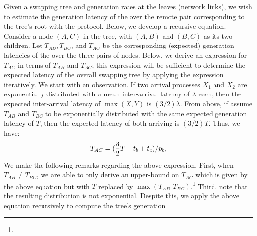 Given a swapping tree and \eps generation rates at the leaves (network links), we 
wish to estimate the generation latency of the \epss over the remote pair corresponding
to the tree's root with the \wt protocol. 
Below, we develop a recursive equation.
Consider a node $(A,C)$ in the tree, with $(A,B)$ and $(B,C)$ as its two children. 
Let $T_{AB}, T_{BC}$, and $T_{AC}$ be the corresponding (expected) generation latencies 
of the \epss over the three pairs of nodes. Below, we derive an expression for $T_{AC}$
in terms of  $T_{AB}$ and $T_{BC}$; this expression will be sufficient to determine the
expected latency of the overall swapping tree by applying the expression iteratively.
We start with an observation.
If two \eps arrival processes $X_1$ and $X_2$ are exponentially distributed 
with a mean inter-arrival
latency of $\lambda$ each, then the expected inter-arrival latency of 
$\max(X,Y)$ is $(3/2)\lambda$.
\label{ob:swapping_expdist}
From above, if assume $T_{AB}$ and  $T_{BC}$ to be exponentially 
distributed  
with the same expected generation latency of $T$, 
then the expected latency of both \epss arriving is $(3/2)T$. 
Thus, we have: 
\begin{equation}
T_{AC} = (\frac{3}{2} T + \mbox{$t_{b}$} + \mbox{$t_c$})/\mbox{$p_{b}$}, \label{eqn:swapping_tree-rate}
\end{equation}
We make the following remarks regarding the above expression.
First, when $T_{AB} \neq T_{BC}$, we are able to only derive an upper-bound on 
$T_{AC}$ which is given by the above equation but with $T$ replaced by
$\max(T_{AB}, T_{BC})$.\footnote{}
Third, note that
the resulting distribution is not exponential. 
Despite this, we apply the above equation recursively to compute the tree's generation
